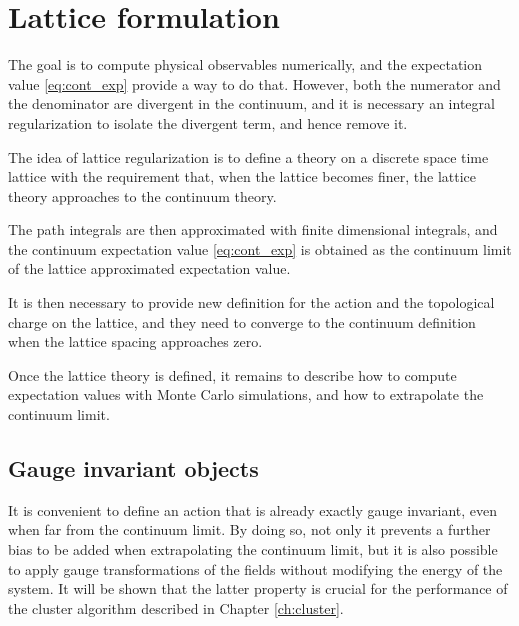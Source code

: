 \section{Lattice formulation}
The goal is to compute physical observables numerically, and the expectation value \eqref{eq:cont_exp} provide a way to do that.
However, both the numerator and the denominator are divergent in the continuum, and it is necessary an integral regularization to isolate the divergent term,
and hence remove it.

The idea of lattice regularization is to define a theory on a discrete space time lattice with the requirement that,
when the lattice becomes finer, the lattice theory approaches to the continuum theory.

The path integrals are then approximated with finite dimensional integrals,
and the continuum expectation value \eqref{eq:cont_exp} is obtained as the continuum limit of the lattice approximated expectation value.

It is then necessary to provide new definition for the action and the topological charge on the lattice,
and they need to converge to the continuum definition when the lattice spacing approaches zero.

Once the lattice theory is defined, it remains to describe how to compute expectation values with Monte Carlo simulations, and how to extrapolate the continuum limit.

%

\subsection*{Gauge invariant objects}

It is convenient to define an action that is already exactly gauge invariant, even when far from the continuum limit.
By doing so, not only it prevents a further bias to be added when extrapolating the continuum limit,
but it is also possible to apply gauge transformations of the fields without modifying the energy of the system.
It will be shown that the latter property is crucial for the performance of the cluster algorithm described in Chapter \ref{ch:cluster}.

